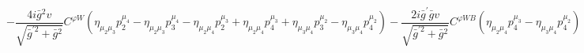 %
\begin{dmath*}
%
  -  \frac{4 i {\bar g}{}^2 v}{\sqrt{{\bar g}^{\prime 2} + {\bar g}{}^2}}C^{ \varphi  W} \left(\eta_{\mu_2 \mu_3} p_2^{\mu_4} - \eta_{\mu_2 \mu_3} p_3^{\mu_4} - \eta_{\mu_2 \mu_4} p_2^{\mu_3} + \eta_{\mu_2 \mu_4} p_4^{\mu_3} + \eta_{\mu_3 \mu_4} p_3^{\mu_2} - \eta_{\mu_3 \mu_4} p_4^{\mu_2}\right)  -  \frac{2 i {\bar g}^\prime {\bar g}{} v}{\sqrt{{\bar g}^{\prime 2} + {\bar g}{}^2}}C^{ \varphi  WB} \left(\eta_{\mu_2 \mu_4} p_4^{\mu_3} - \eta_{\mu_3 \mu_4} p_4^{\mu_2}\right)
%
\end{dmath*}
%
